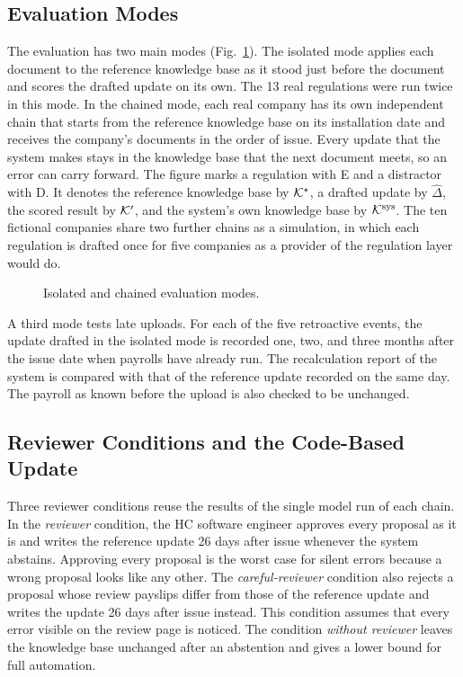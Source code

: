 \subsection{Evaluation Modes}
\label{sec:modes}
The evaluation has two main modes (Fig.~\ref{fig:protocol}). The isolated mode applies each document to the reference knowledge base as it stood just before the document and scores the drafted update on its own. The 13 real regulations were run twice in this mode. In the chained mode, each real company has its own independent chain that starts from the reference knowledge base on its installation date and receives the company's documents in the order of issue. Every update that the system makes stays in the knowledge base that the next document meets, so an error can carry forward. The figure marks a regulation with E and a distractor with D. It denotes the reference knowledge base by $\mathcal{K}^\star$, a drafted update by $\hat\Delta$, the scored result by $\mathcal{K}'$, and the system's own knowledge base by $\mathcal{K}^{\mathrm{sys}}$. The ten fictional companies share two further chains as a simulation, in which each regulation is drafted once for five companies as a provider of the regulation layer would do.

\begin{figure}[!t]
\centering
\figReplayProtocol
\caption{Isolated and chained evaluation modes.}
\label{fig:protocol}
\end{figure}

A third mode tests late uploads. For each of the five retroactive events, the update drafted in the isolated mode is recorded one, two, and three months after the issue date when payrolls have already run. The recalculation report of the system is compared with that of the reference update recorded on the same day. The payroll as known before the upload is also checked to be unchanged.

\subsection{Reviewer Conditions and the Code-Based Update}
\label{sec:conditions}
Three reviewer conditions reuse the results of the single model run of each chain. In the \emph{reviewer} condition, the HC software engineer approves every proposal as it is and writes the reference update 26 days after issue whenever the system abstains. Approving every proposal is the worst case for silent errors because a wrong proposal looks like any other. The \emph{careful-reviewer} condition also rejects a proposal whose review payslips differ from those of the reference update and writes the update 26 days after issue instead. This condition assumes that every error visible on the review page is noticed. The condition \emph{without reviewer} leaves the knowledge base unchanged after an abstention and gives a lower bound for full automation.

